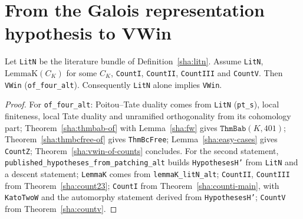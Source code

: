 \section{From the Galois representation hypothesis to VWin}

\begin{theorem}\label{sha:vwin-hyp}
Let \texttt{LitN} be the literature bundle of Definition~\ref{sha:litn}. Assume
\texttt{LitN}, $\mathrm{LemmaK}(C_K)$ for some $C_K$, \texttt{CountI}, \texttt{CountII},
\texttt{CountIII} and \texttt{CountV}. Then \texttt{VWin} (\texttt{of\_four\_alt}).
Consequently \texttt{LitN} alone implies \texttt{VWin}.
\end{theorem}
\begin{proof}
For \texttt{of\_four\_alt}: Poitou--Tate duality comes from \texttt{LitN} (\texttt{pt\_s}),
local finiteness, local Tate duality and unramified orthogonality from its cohomology part;
Theorem~\ref{sha:thmbab-of} with Lemma~\ref{sha:fw} gives $\texttt{ThmBab}(K,401)$;
Theorem~\ref{sha:thmbcfree-of} gives \texttt{ThmBcFree}; Lemma~\ref{sha:easy-cases} gives
\texttt{CountZ}; Theorem~\ref{sha:vwin-of-counts} concludes. For the second statement,
\texttt{published\_hypotheses\_from\_patching\_alt} builds \texttt{HypothesesH'} from
\texttt{LitN} and a descent statement; \texttt{LemmaK} comes from \texttt{lemmaK\_litN\_alt};
\texttt{CountII}, \texttt{CountIII} from Theorem~\ref{sha:count23}; \texttt{CountI} from
Theorem~\ref{sha:counti-main}, with \texttt{KatoTwoW} and the automorphy statement derived
from \texttt{HypothesesH'}; \texttt{CountV} from Theorem~\ref{sha:countv}.
\end{proof}

